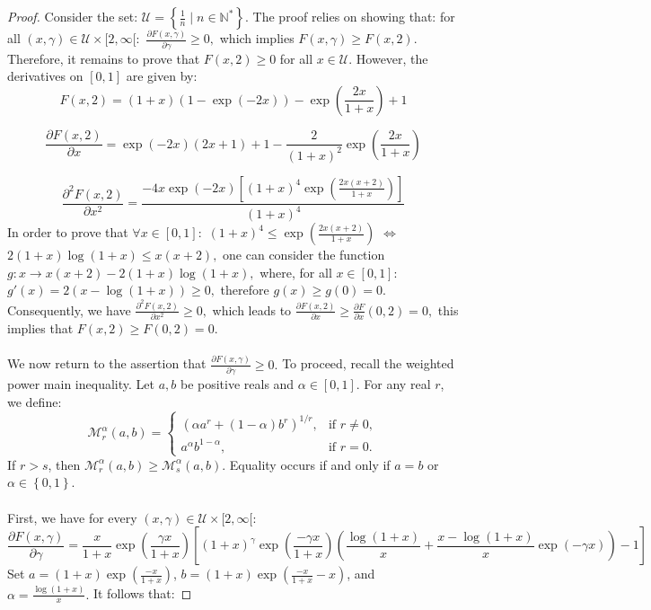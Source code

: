 \documentclass[11pt]{amsart}
\newcommand{\1}{[1]}
\begin{document}
\begin{proof} Consider the set: $\mathcal{U} = \left\{ \frac{1}{n} \mid n \in \mathbb{N}^{*} \right\}.$ The proof relies on showing that: for all
$(x,\gamma)\in \mathcal{U} \times [2,\infty[:$  $ \frac{\partial F(x,\gamma)}{\partial \gamma} \geq 0,$
which implies $F(x,\gamma) \geq  F(x,2).$ Therefore, it remains to prove that $F(x,2) \geq 0$ for all $x \in \mathcal{U}.$ 
However, the derivatives on $[0,1]$ are given by:
$$F(x,2)= (1+x)(1-\exp(-2x))- \exp\left(\frac{2x}{1+x}\right) +1 $$

$$\frac{\partial F(x,2)}{\partial x} = \exp(-2x)(2x+1)+1 - \frac{2}{(1+x)^2} \exp\left(\frac{2x}{1+x}\right)$$

$$\frac{\partial^2 F(x,2)}{\partial x^2} = \frac{-4 x \exp(-2x) \left[(1+x)^4 \exp\left(\frac{2x(x+2)}{1+x}\right) \right]} {(1+x)^4}$$ 
In order to prove that $\forall x \in [0,1]:$ $(1+x)^4 \leq \exp\left(\frac{2x(x+2)}{1+x}\right)$ $\Leftrightarrow $ 
$2(1+x) \log(1+x) \leq x(x+2),$ one can consider the function $g: x \to x(x+2)- 2(1+x)\log(1+x),$ where, for all $x \in [0,1]:$ \\
$g'(x)=2(x-\log(1+x)) \geq 0,$ therefore $g(x) \geq g(0)=0.$ Consequently, we have $\frac{\partial^2 F(x,2)}{\partial x^2} \geq 0,$ which leads to $\frac{\partial F(x,2)}{\partial x} \geq \frac{\partial F}{\partial x} (0,2) = 0,$ this implies that $F(x,2) \geq F(0,2) = 0.$ \\ \\
We now return to the assertion that $\frac{\partial F(x,\gamma)}{\partial \gamma} \geq 0.$ To proceed, recall the weighted power main inequality. Let $a,b$ be positive reals and $\alpha \in [0,1].$ For any real $r$, we define:
$$
\mathcal{M}_{r}^{\alpha}(a,b) =
\begin{cases}
\left( \alpha a^r + (1-\alpha) b^r \right)^{1/r}, & \text{if } r \neq 0, \\
a^{\alpha} b^{1-\alpha}, & \text{if } r = 0.
\end{cases}
$$
If $r > s$, then $\mathcal{M}_{r}^{\alpha}(a,b) \geq \mathcal{M}_{s}^{\alpha}(a,b)$. Equality occurs if and only if $a=b$ or $\alpha \in \left\{0,1\right\}$. \\ \\
First, we have for every $(x,\gamma) \in \mathcal{U} \times [2,\infty[:$
$$\frac{\partial F(x,\gamma)}{\partial \gamma} =
\frac{x}{1+x}  \exp \left( \frac{\gamma x}{1+x} \right) \left[ (1+x)^{\gamma} \exp \left( \frac{-\gamma x}{1+x}\right) \left( \frac{\log(1+x)}{x} + \frac{x- \log(1+x)}{x} \exp(-\gamma x) \right) - 1 \right] $$
Set $ a = (1 + x) \exp\left(\frac{-x}{1 + x}\right) $, $ b = (1 + x) \exp\left(\frac{-x}{1 + x} - x\right) $, and $ \alpha = \frac{\log(1 + x)}{x}.$ It follows that:


\end{proof}
\end{document}
